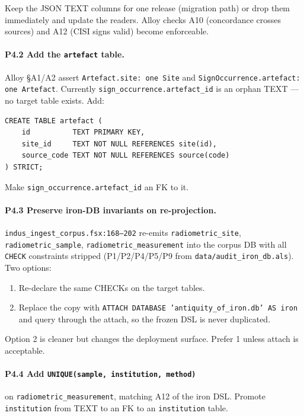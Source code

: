 \documentclass[11pt]{article}
\begin{document}
Keep the JSON TEXT columns for one release (migration path) or
drop them immediately and update the readers.  Alloy checks A10
(concordance crosses sources) and A12 (CISI signs valid) become
enforceable.

\paragraph{P4.2 Add the \texttt{artefact} table.}
Alloy \S A1/A2 assert \texttt{Artefact.site: one Site} and
\texttt{SignOccurrence.artefact: one Artefact}.  Currently
\texttt{sign\_occurrence.artefact\_id} is an orphan TEXT ---
no target table exists.  Add:

\begin{Verbatim}[fontsize=\small,frame=single]
CREATE TABLE artefact (
    id          TEXT PRIMARY KEY,
    site_id     TEXT NOT NULL REFERENCES site(id),
    source_code TEXT NOT NULL REFERENCES source(code)
) STRICT;
\end{Verbatim}

Make \texttt{sign\_occurrence.artefact\_id} an FK to it.

\paragraph{P4.3 Preserve iron-DB invariants on re-projection.}
\texttt{indus\_ingest\_corpus.fsx:168--202} re-emits
\texttt{radiometric\_site}, \texttt{radiometric\_sample},
\texttt{radiometric\_measurement} into the corpus DB with all
\texttt{CHECK} constraints stripped (P1/P2/P4/P5/P9 from
\texttt{data/audit\_iron\_db.als}).  Two options:

\begin{enumerate}[leftmargin=2em]
\item Re-declare the same CHECKs on the target tables.
\item Replace the copy with \texttt{ATTACH DATABASE
  'antiquity\_of\_iron.db' AS iron} and query through the attach,
  so the frozen DSL is never duplicated.
\end{enumerate}

Option 2 is cleaner but changes the deployment surface.  Prefer
1 unless attach is acceptable.

\paragraph{P4.4 Add \texttt{UNIQUE(sample, institution, method)}}
on \texttt{radiometric\_measurement}, matching A12 of the iron
DSL.  Promote \texttt{institution} from TEXT to an FK to an
\texttt{institution} table.
\end{document}
